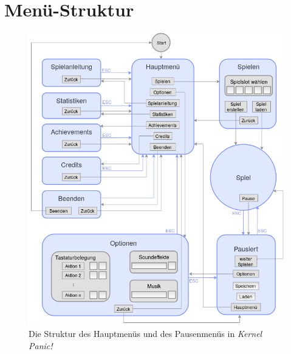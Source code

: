 \section{Menü-Struktur}


%
%

\begin{figure}[ht]
	\centering
	\includegraphics[width=1\textwidth]{menu_structure.png}
  \caption{Die Struktur des Hauptmenüs und des Pausenmenüs in \emph{Kernel Panic!}}
	\label{fig:menu}
\end{figure}

